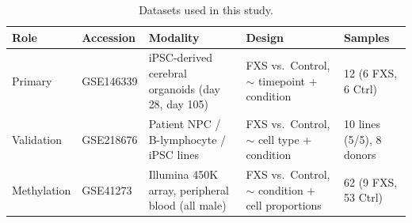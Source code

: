 \documentclass[journal]{IEEEtran}
\begin{document}
\begin{table}[!t]
\centering
\caption{Datasets used in this study.}
\label{tab:datasets}
\small
\begin{tabular}{@{}llp{}p{}l@{}}
\toprule
Role & Accession & Modality & Design & Samples\\
\midrule
Primary & GSE146339 & iPSC-derived cerebral organoids (day 28, day 105) & FXS vs.\ Control, $\sim$ timepoint + condition & 12 (6 FXS, 6 Ctrl)\\
Validation & GSE218676 & Patient NPC / B-lymphocyte / iPSC lines & FXS vs.\ Control, $\sim$ cell type + condition & 10 lines (5/5), 8 donors\\
Methylation & GSE41273 & Illumina 450K array, peripheral blood (all male) & FXS vs.\ Control, $\sim$ condition + cell proportions & 62 (9 FXS, 53 Ctrl)\\
\bottomrule
\end{tabular}
\end{table}
\end{document}
